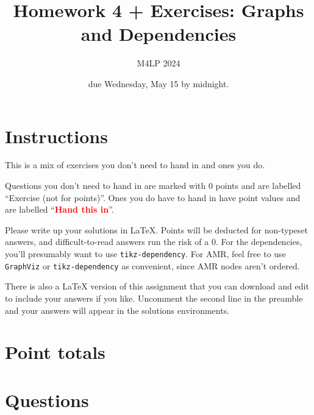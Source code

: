 \documentclass[addpoints
]{exam}
\title{Homework 4 + Exercises: Graphs and Dependencies} %
\author{M4LP 2024}
\date{due Wednesday, May 15 by midnight.}
\theoremstyle{definition}
\newcommand{\handin}{\textcolor{red}{\textbf{Hand this in}}}
\newcommand{\exer}{Exercise (not for points)}
\begin{document}
\maketitle

\section{Instructions}
\label{sec:instructions}



This is a mix of exercises you don't need to hand in and ones you do.

Questions you don't need to hand in are marked with 0 points and are labelled ``\exer''. Ones you do have to hand in have point values and are labelled ``\handin''. 

Please write up your solutions in \LaTeX{}. Points will be deducted for non-typeset answers, and difficult-to-read answers run the risk of a 0. For the dependencies, you'll presumably want to use \texttt{tikz-dependency}. For AMR, feel free to use \texttt{GraphViz} or \texttt{tikz-dependency} as convenient, since AMR nodes aren't ordered.


There is also a \LaTeX{} version of this assignment that you can download and edit to include your answers if you like. Uncomment the second line in the preamble and your answers will appear in the solutions environments.

\section{Point totals}
\label{sec:point-totals}


\combinedgradetable[h][questions]


\section{Questions}
\label{sec:questions}
\end{document}
